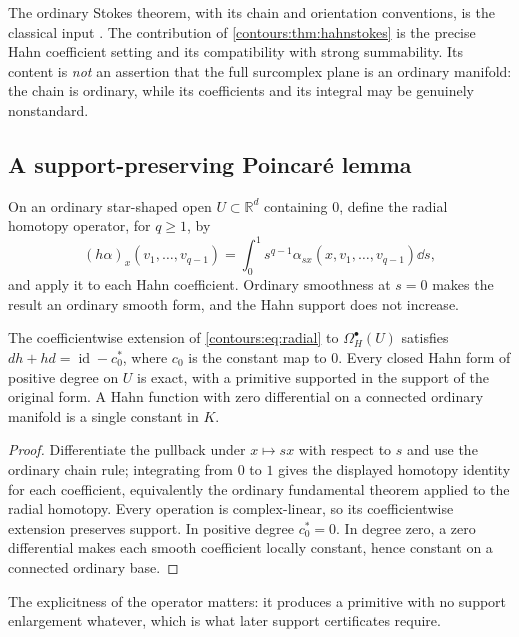 \documentclass[11pt,letterpaper]{article}
\theoremstyle{definition}
\theoremstyle{remark}
\newcommand{\R}{\mathbb R}\newcommand{\C}{\mathbb C}\newcommand{\Q}{\mathbb Q}
\newcommand{\id}{\operatorname{id}}\newcommand{\vH}{v_{\!H}}
\numberwithin{equation}{section}
\begin{document}
The ordinary Stokes theorem, with its chain and orientation conventions, is the
classical input \cite{Lee,GH}. The contribution of
\cref{contours:thm:hahnstokes} is the precise Hahn coefficient setting and its
compatibility with strong summability. Its content is \emph{not} an assertion that
the full surcomplex plane is an ordinary manifold: the chain is ordinary, while its
coefficients and its integral may be genuinely nonstandard.

\subsection{A support-preserving Poincar\'e lemma}
On an ordinary star-shaped open $U\subset\R^d$ containing $0$, define the radial
homotopy operator, for $q\ge1$, by
\begin{equation}\label{contours:eq:radial}
  (h\alpha)_x(v_1,\ldots,v_{q-1})
  =\int_0^1 s^{q-1}\alpha_{sx}(x,v_1,\ldots,v_{q-1})\dd s ,
\end{equation}
and apply it to each Hahn coefficient. Ordinary smoothness at $s=0$ makes the
result an ordinary smooth form, and the Hahn support does not increase.

\begin{proposition}
\label{contours:prop:poincare}
The coefficientwise extension of \eqref{contours:eq:radial} to
$\Omega_H^\bullet(U)$ satisfies $dh+hd=\id-c_0^*$, where $c_0$ is the constant map
to $0$. Every closed Hahn form of positive degree on $U$ is exact, with a primitive
supported in the support of the original form. A Hahn function with zero
differential on a connected ordinary manifold is a single constant in $K$.
\end{proposition}
\begin{proof}
Differentiate the pullback under $x\mapsto sx$ with respect to $s$ and use the
ordinary chain rule; integrating from $0$ to $1$ gives the displayed homotopy
identity for each coefficient, equivalently the ordinary fundamental theorem applied
to the radial homotopy. Every operation is complex-linear, so its coefficientwise
extension preserves support. In positive degree $c_0^*=0$. In degree zero, a zero
differential makes each smooth coefficient locally constant, hence constant on a
connected ordinary base.
\end{proof}

The explicitness of the operator matters: it produces a primitive with no support
enlargement whatever, which is what later support certificates require.
\end{document}
